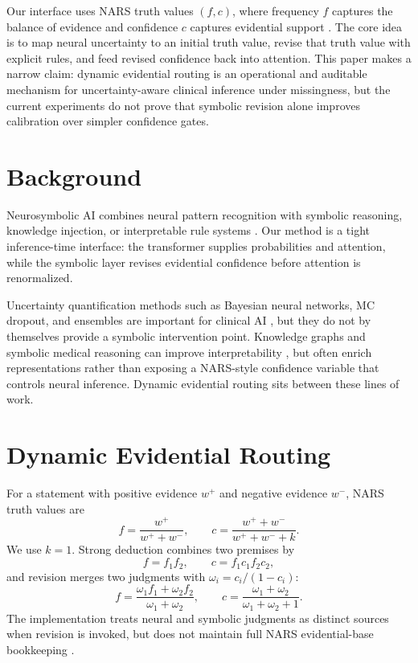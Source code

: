 \documentclass{article}
\begin{document}
Our interface uses NARS truth values $(f,c)$, where frequency $f$ captures the balance of evidence and confidence $c$ captures evidential support \citep{wang1995,wang2006,wang2013}. The core idea is to map neural uncertainty to an initial truth value, revise that truth value with explicit rules, and feed revised confidence back into attention. This paper makes a narrow claim: dynamic evidential routing is an operational and auditable mechanism for uncertainty-aware clinical inference under missingness, but the current experiments do not prove that symbolic revision alone improves calibration over simpler confidence gates.

\section{Background}
\label{sec:background}

Neurosymbolic AI combines neural pattern recognition with symbolic reasoning, knowledge injection, or interpretable rule systems \citep{garcez2020,marra2021,bhuyan2024,colelough2025}. Our method is a tight inference-time interface: the transformer supplies probabilities and attention, while the symbolic layer revises evidential confidence before attention is renormalized.

Uncertainty quantification methods such as Bayesian neural networks, MC dropout, and ensembles are important for clinical AI \citep{blundell2015,gal2016,lakshminarayanan2017,abad2025}, but they do not by themselves provide a symbolic intervention point. Knowledge graphs and symbolic medical reasoning can improve interpretability \citep{wu2023,jiang2024,chudasama2025}, but often enrich representations rather than exposing a NARS-style confidence variable that controls neural inference. Dynamic evidential routing sits between these lines of work.

\section{Dynamic Evidential Routing}
\label{sec:method}

For a statement with positive evidence $w^+$ and negative evidence $w^-$, NARS truth values are
\begin{equation}
f=\frac{w^+}{w^+ + w^-},\qquad
c=\frac{w^+ + w^-}{w^+ + w^- + k}.
\label{eq:truth}
\end{equation}
We use $k=1$. Strong deduction combines two premises by
\begin{equation}
f=f_1f_2,\qquad c=f_1c_1f_2c_2,
\label{eq:deduction}
\end{equation}
and revision merges two judgments with $\omega_i=c_i/(1-c_i)$:
\begin{equation}
f=\frac{\omega_1 f_1+\omega_2 f_2}{\omega_1+\omega_2},\qquad
c=\frac{\omega_1+\omega_2}{\omega_1+\omega_2+1}.
\label{eq:revision}
\end{equation}
The implementation treats neural and symbolic judgments as distinct sources when revision is invoked, but does not maintain full NARS evidential-base bookkeeping \citep{wang2024draft}.
\end{document}
